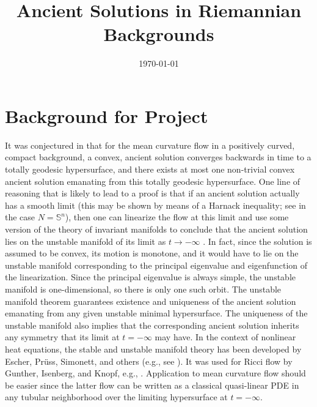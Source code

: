\documentclass{amsart}
\begin{document}
\title[Ancient Solutions]
 {Ancient Solutions in Riemannian Backgrounds}

\curraddr{}
\email{}
\date{\today}

\dedicatory{}
\subjclass[2010]{}
\keywords{}

\begin{abstract}
\end{abstract}

\maketitle

\section{Background for Project}
\label{sec:background}

It was conjectured in \cite{IvakiBryan} that for the mean curvature flow in a positively curved, compact background, a convex, ancient solution converges backwards in time to a totally geodesic hypersurface, and there exists at most one non-trivial convex ancient solution emanating from this totally geodesic hypersurface. One line of reasoning that is likely to lead to a proof is that if an ancient solution actually has a smooth limit (this may be shown by means of a Harnack inequality; see \cite{IvakiBryan} in the case $N=\mathbb{S}^n$), then one can linearize the flow at this limit and use some version of the theory of invariant manifolds to conclude that the ancient solution lies on the unstable manifold of its limit as $t\to-\infty$ \cite[Chapters 8, 9]{lunardi2012analytic}. In fact, since the solution is assumed to be convex, its motion is monotone, and it would have to lie on the unstable manifold corresponding to the principal eigenvalue and eigenfunction of the linearization. Since the principal eigenvalue is always simple, the unstable manifold is one-dimensional, so there is only one such orbit. The unstable manifold theorem guarantees existence and uniqueness of the ancient solution emanating from any given unstable minimal hypersurface. The uniqueness of the unstable manifold also implies that the corresponding ancient solution inherits any symmetry that its limit at $t=-\infty$ may have. In the context of nonlinear heat equations, the stable and unstable manifold theory has been developed by Escher, Pr\"{u}ss, Simonett, and others (e.g., see \cite{pruess2012invariant}). It was used for Ricci flow by Gunther, Isenberg, and Knopf, e.g., \cite{guenther2002stability}. Application to mean curvature flow should be easier since the latter flow can be written as a classical quasi-linear PDE in any tubular neighborhood over the limiting hypersurface at $t=-\infty$.
\end{document}
